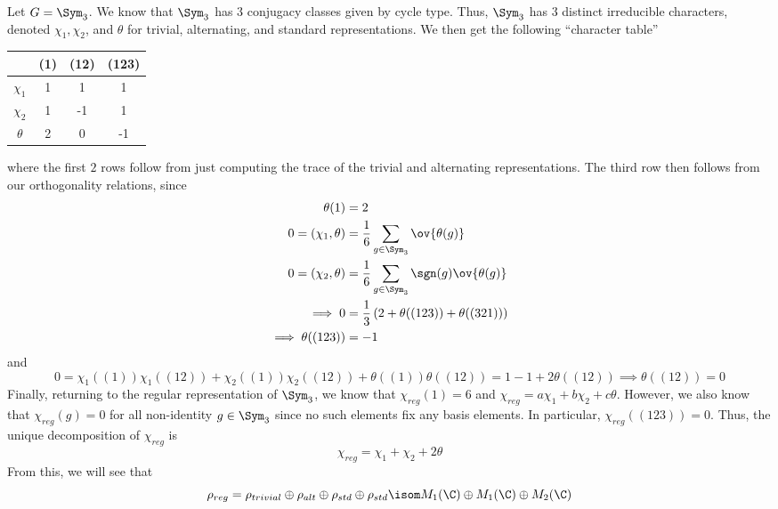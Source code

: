 \documentclass[11pt,leqno,oneside]{amsbook}
\numberwithin{thm}{section}
\begin{document}
\begin{example}\label{char-table-for-S3}
  Let \(G = \Sym_3\). We know that \(\Sym_3\) has \(3\) conjugacy
  classes given by cycle type. Thus, \(\Sym_3\) has \(3\) distinct
  irreducible characters, denoted \(\chi_1, \chi_2\), and \(\theta\)
  for trivial, alternating, and standard representations. We then get
  the following ``character table'' \\
  \begin{center}
    \begin{tabular}{c|ccc}
      &(1)&(12)&(123) \\
      \hline
      \(\chi_1\) &1&1&1 \\
      \(\chi_2\) &1&-1&1\\
      \(\theta\) &2&0&-1
    \end{tabular}
  \end{center}
  where the first \(2\) rows follow from just computing the trace of
  the trivial and alternating representations. The third row then
  follows from our orthogonality relations, since
  \begin{align*}
    \theta(1) & = 2 \\
    0 = (\chi_1,\theta) & = \frac{1}{6} \sum_{g \in \Sym_3}
    \ov{\theta(g)} \\
    0 = (\chi_2, \theta) & = \frac{1}{6} \sum_{g \in \Sym_3} \sgn(g)
    \ov{\theta(g)} \\
    \implies 0 & = \frac{1}{3}\left( 2 + \theta((123)) + \theta((321))
    \right) \\
    \implies \theta((123)) & = -1
  \end{align*}
  and \[
    0 = \chi_1((1)) \chi_1((12)) + \chi_2((1)) \chi_2((12)) +
    \theta((1)) \theta((12)) = 1 - 1 + 2 \theta((12)) \implies
    \theta((12)) = 0
  \]
  Finally, returning to the regular representation of \(\Sym_3\), we
  know that \(\chi_{reg}(1) = 6\) and \(\chi_{reg} = a \chi_1 + b
  \chi_2 + c \theta\). However, we also know that \(\chi_{reg}(g) =
  0\) for all non-identity \(g \in \Sym_3\) since no such elements fix
  any basis elements. In particular,
  \(\chi_{reg}((123)) = 0\). Thus, the unique
  decomposition of \(\chi_{reg}\) is \[
    \chi_{reg} = \chi_1 + \chi_2 + 2 \theta
  \]
  From this, we will see that \[
    \rho_{reg} = \rho_{trivial} \oplus \rho_{alt} \oplus \rho_{std}
    \oplus \rho_{std} \isom M_1(\C) \oplus M_1(\C) \oplus M_2(\C)
  \]
\end{example}
\end{document}
